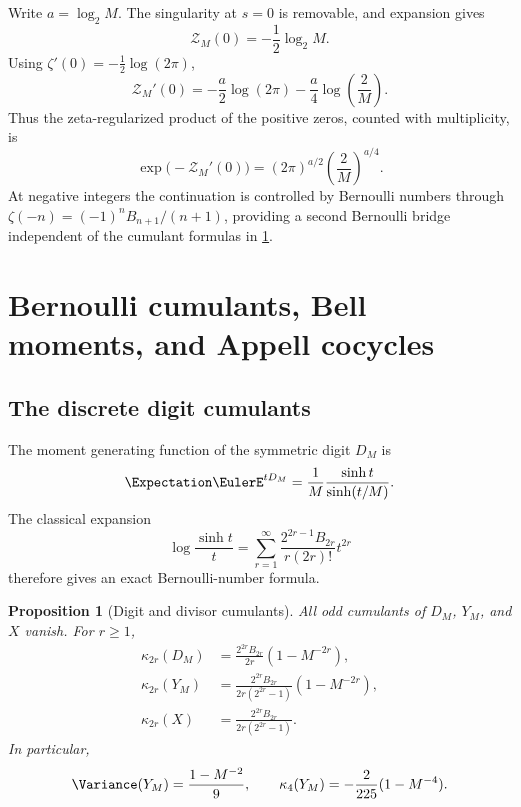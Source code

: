 \documentclass[11pt,oneside]{article}
\newtheorem{proposition}[theorem]{Proposition}
\theoremstyle{definition}
\theoremstyle{remark}
\begin{document}
Write $a=\log_2M$.  The singularity at $s=0$ is removable, and expansion gives
\begin{equation}
 \mathcal Z_M(0)=-\frac12\log_2M.
 \label{eq:ZM-zero}
\end{equation}
Using $\zeta'(0)=-\frac12\log(2\pi)$,
\begin{equation}
 \mathcal Z_M'(0)
 =-\frac a2\log(2\pi)-\frac a4\log\!\left(\frac2M\right).
 \label{eq:ZM-derivative-zero}
\end{equation}
Thus the zeta-regularized product of the positive zeros, counted with multiplicity, is
\begin{equation}
 \exp\bigl(-\mathcal Z_M'(0)\bigr)
 =(2\pi)^{a/2}\left(\frac2M\right)^{a/4}.
 \label{eq:zeta-determinant}
\end{equation}
At negative integers the continuation is controlled by Bernoulli numbers through
$\zeta(-n)=(-1)^nB_{n+1}/(n+1)$, providing a second Bernoulli bridge independent of the
cumulant formulas in \cref{sec:cumulants}.

\section{Bernoulli cumulants, Bell moments, and Appell cocycles}
\label{sec:cumulants}

\subsection{The discrete digit cumulants}

The moment generating function of the symmetric digit $D_M$ is
\begin{equation}
 \Expectation\EulerE^{tD_M}
 =\frac1M\frac{\sinh t}{\sinh(t/M)}.
 \label{eq:DM-mgf}
\end{equation}
The classical expansion
\begin{equation}
 \log\frac{\sinh t}{t}
 =\sum_{r=1}^{\infty}
 \frac{2^{2r-1}B_{2r}}{r(2r)!}t^{2r}
 \label{eq:logsinh-Bernoulli}
\end{equation}
therefore gives an exact Bernoulli-number formula.

\begin{proposition}[Digit and divisor cumulants]
\label{prop:cumulants}
All odd cumulants of $D_M$, $Y_M$, and $X$ vanish.  For $r\ge1$,
\begin{align}
 \kappa_{2r}(D_M)
 &=\frac{2^{2r}B_{2r}}{2r}\left(1-M^{-2r}\right),
 \label{eq:DM-cumulants}\\
 \kappa_{2r}(Y_M)
 &=\frac{2^{2r}B_{2r}}{2r(2^{2r}-1)}
   \left(1-M^{-2r}\right),
 \label{eq:YM-cumulants}\\
 \kappa_{2r}(X)
 &=\frac{2^{2r}B_{2r}}{2r(2^{2r}-1)}.
 \label{eq:X-cumulants}
\end{align}
In particular,
\begin{equation}
 \Variance(Y_M)=\frac{1-M^{-2}}9,
 \qquad
 \kappa_4(Y_M)=-\frac2{225}(1-M^{-4}).
 \label{eq:first-cumulants}
\end{equation}
\end{proposition}
\end{document}
